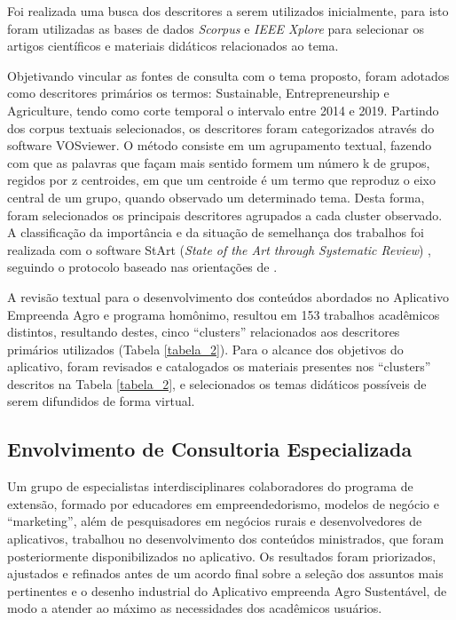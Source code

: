 Foi realizada uma busca dos descritores a serem utilizados inicialmente, para isto foram utilizadas as bases de dados \textit{Scorpus} e \textit{IEEE Xplore} para selecionar os artigos científicos e materiais didáticos relacionados ao tema.

Objetivando vincular as fontes de consulta com o tema proposto, foram adotados como descritores primários os termos: Sustainable, Entrepreneurship e Agriculture, tendo como corte temporal o intervalo entre 2014 e 2019. Partindo dos corpus textuais selecionados, os descritores foram categorizados através do software VOSviewer. O método consiste em um agrupamento textual, fazendo com que as palavras que façam mais sentido formem um número k de grupos, regidos por z centroides, em que um centroide é um termo que reproduz o eixo central de um grupo, quando observado um determinado tema. Desta forma, foram selecionados os principais descritores agrupados a cada cluster observado. A classificação da importância e da situação de semelhança dos trabalhos foi realizada com o software StArt (\textit{State of the Art through Systematic Review}) \cite{lapes_start_2005}, seguindo o protocolo baseado nas orientações de . 

A revisão textual para o desenvolvimento dos conteúdos abordados no Aplicativo Empreenda Agro e programa homônimo, resultou em 153 trabalhos acadêmicos distintos, resultando destes, cinco “clusters” relacionados aos descritores primários utilizados (Tabela \ref{tabela_2}). Para o alcance dos objetivos do aplicativo, foram revisados e catalogados os materiais presentes nos “clusters” descritos na Tabela \ref{tabela_2}, e selecionados os temas didáticos possíveis de serem difundidos de forma virtual.


\subsection{Envolvimento de Consultoria Especializada}

Um grupo de especialistas interdisciplinares colaboradores do programa de extensão, formado por educadores em empreendedorismo, modelos de negócio e “marketing”, além de pesquisadores em negócios rurais e desenvolvedores de aplicativos, trabalhou no desenvolvimento dos conteúdos ministrados, que foram posteriormente disponibilizados no aplicativo. Os resultados foram priorizados, ajustados e refinados antes de um acordo final sobre a seleção dos assuntos mais pertinentes e o desenho industrial do Aplicativo empreenda Agro Sustentável, de modo a atender ao máximo as necessidades dos acadêmicos usuários.

